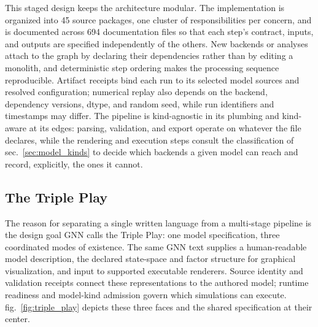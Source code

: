 \documentclass[
  english,
  9pt,
]{extarticle}
\begin{document}
This staged design keeps the architecture modular. The implementation is
organized into 45 source packages, one cluster of responsibilities per
concern, and is documented across 694 documentation files so that each
step's contract, inputs, and outputs are specified independently of the
others. New backends or analyses attach to the graph by declaring their
dependencies rather than by editing a monolith, and deterministic step
ordering makes the processing sequence reproducible. Artifact receipts
bind each run to its selected model sources and resolved configuration;
numerical replay also depends on the backend, dependency versions,
dtype, and random seed, while run identifiers and timestamps may differ.
The pipeline is kind-agnostic in its plumbing and kind-aware at its
edges: parsing, validation, and export operate on whatever the file
declares, while the rendering and execution steps consult the
classification of sec.~\ref{sec:model_kinds} to decide which backends a
given model can reach and record, explicitly, the ones it cannot.

\subsection{The Triple Play}\label{the-triple-play}

The reason for separating a single written language from a multi-stage
pipeline is the design goal GNN calls the Triple Play: one model
specification, three coordinated modes of existence. The same GNN text
supplies a human-readable model description, the declared state-space
and factor structure for graphical visualization, and input to supported
executable renderers. Source identity and validation receipts connect
these representations to the authored model; runtime readiness and
model-kind admission govern which simulations can execute.
fig.~\ref{fig:triple_play} depicts these three faces and the shared
specification at their center.
\end{document}
